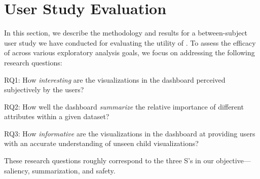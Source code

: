 \section{User Study Evaluation\label{sec:userstudy}}
In this section, we describe the methodology and results for a between-subject user study we have conducted for evaluating the utility of \system. To assess the efficacy of \system across various exploratory analysis goals, we focus on addressing the following research questions:
\begin{denselist}
	\item RQ1: How \textit{interesting} are the visualizations in the dashboard perceived subjectively by the users?
	\item RQ2: How well  the dashboard \textit{summarize} the relative importance of different attributes within a given dataset?
	\item RQ3: How \textit{informative} are the visualizations in the dashboard at providing users with an accurate understanding of unseen child visualizations? 
\end{denselist}
These research questions roughly correspond to the three S's in our objective---saliency, summarization, and safety.
